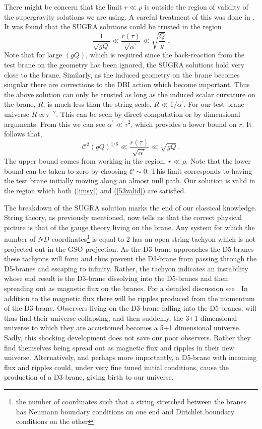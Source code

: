 \documentclass[a4paper,12pt]{article}
\newcommand{\ap}{\alpha^{\prime}}
\begin{document}
There might be concern that the limit $r \ll \rho$ is
outside the region of validity of the supergravity solutions we are
using. A careful treatment of this was done in \cite{imsy}.  It was
found that the SUGRA solutions could be trusted in the region
\begin{equation}
\frac{1}{\sqrt{g Q}}  \ll \frac{r(\tau)}{\sqrt{\ap}} \ll
\sqrt{\frac{Q}{g}} \ .
\label{imsy}
\end{equation}
Note that for large $(g Q)$, which is required since the
back-reaction from the test brane on the geometry has been ignored,
the SUGRA solutions hold very close to the brane.
Similarly, as the induced geometry on the brane becomes singular there
are corrections to the DBI action which become important.  Thus the
above solution can only be trusted as long as
the induced scalar curvature on the brane, $R$, is much less than
the string scale,  
$R \ll 1 / \alpha^{\prime}$.  For our test brane universe 
$R \propto \tau^{-2}$.
This can be seen by direct computation or by dimensional
arguments.  From this we can see $\alpha^{\prime} \ll \tau^2$, 
which provides a lower bound on $r$.  It follows that,
\begin{equation}
\mathcal{C}^2 (g Q)^{1/6} 
\ll \frac{r(\tau)}{\sqrt{\ap}} \ll \sqrt{g Q} \ .
\label{53valid}
\end{equation}
The upper bound comes from working in the region, $r \ll \rho$.
Note that the lower bound can be taken to zero by choosing
$\mathcal{C} \sim 0$.  This limit corresponds to having the test brane
initially moving along an almost null path.
Our solution is valid in the region which both (\ref{imsy}) and (\ref{53valid})
are satisfied.

The breakdown of the SUGRA solution marks the end of our classical
knowledge.  String theory, as previously mentioned, now tells us that 
the correct physical picture
is that of the gauge theory living on the brane.  Any system for which
the number of $ND$ coordinates\footnote{the number of coordinates such that a
string stretched between the branes has Neumann boundary conditions on
one end and Dirichlet boundary conditions on the other} is equal to 2 has
an open string tachyon which is not projected out in the GSO
projection.  As the
D3-brane approaches the D5-branes these tachyons will form and thus
prevent the D3-brane from passing through the D5-branes and escaping
to infinity.  Rather, the tachyon indicates an instability whose
end result is the D3-brane dissolving into the D5-branes and then spreading
out as magnetic flux on the
branes.  For a detailed discussion see \cite{cnds}.  In
addition to the magnetic flux there
will be ripples produced from the momentum of the D3-brane.
Observers living on the D3-brane falling into the D5-branes,
will thus find their universe collapsing, and then suddenly, the 3+1
dimensional universe to which they are accustomed becomes a 5+1
dimensional universe.  Sadly, this shocking development does not save our
poor observers.  Rather they find themselves being spread out as
magnetic flux and
ripples in their new universe.  Alternatively, and perhaps
more importantly, a D5-brane
with incoming flux and ripples could, under very fine tuned initial
conditions, cause the production of a D3-brane, giving birth to
our universe.
%
%
\end{document}
